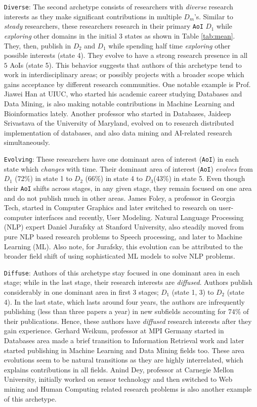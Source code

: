 \texttt{Diverse}: The second archetype consists of researchers with \emph{diverse} research interests as they make significant contributions in multiple $D_m$'s. Similar to \emph{steady} researchers, these researchers research in their primary \texttt{AoI} $D_1$ while \emph{exploring} other domains in the initial $3$ states as shown in Table \ref{tab:mean}. They, then, publish in $D_2$ and $D_1$ while spending half time \emph{exploring} other possible interests (state 4). They evolve to have a strong research presence in all $5$ AoIs (state 5). This behavior suggests that authors of this archetype tend to work in interdisciplinary areas; or possibly projects with a broader scope which gains acceptance by different research communities.
One notable example is Prof. Jiawei Han at UIUC, who started his academic career studying Databases and Data Mining, is also making notable contributions in Machine Learning and Bioinformatics lately.
Another professor who started in Databases, Jaideep Srivastava of the University of Maryland, evolved on to research distributed implementation of databases, and also data mining and AI-related research simultaneously.

\texttt{Evolving}: These researchers have one dominant area of interest (\texttt{AoI}) in each state which \emph{changes} with time. Their dominant  area of interest (\texttt{AoI}) \emph{evolves} from $D_1$ (72\%) in state 1 to $D_2$ (66\%) in state 4 to $D_3$(43\%) in state 5. Even though their \texttt{AoI} shifts across stages, in any given stage, they remain focused on one area and do not publish much in other areas.
James Foley, a professor in Georgia Tech, started in Computer Graphics and later switched to research on user-computer interfaces and recently, User Modeling.
Natural Language Processing (NLP) expert Daniel Jurafsky at Stanford University, also steadily moved from pure NLP based research problems to Speech processing, and later to Machine Learning (ML). Also note, for Jurafsky, this evolution can be attributed to the broader field shift of using sophisticated ML models to solve NLP problems.

\texttt{Diffuse}: Authors of this archetype stay focused in one dominant area in each stage; while in the last stage, their research interests are \emph{diffused}. Authors publish considerably in one dominant area in first 3 stages; $D_1$ (state 1, 3) to $D_2$ (state 4). In the last state, which lasts around four years, the authors are infrequently publishing (less than three papers a year) in new subfields accounting for 74\% of their publications. Hence, these authors have \emph{diffused} research interests after they gain experience.
Gerhard Weikum, professor at MPI Germany started in Databases area made a brief transition to Information Retrieval work and later started publishing in Machine Learning and Data Mining fields too. These area evolutions seem to be natural transitions as they are highly interrelated, which explains contributions in all fields.
Anind Dey, professor at Carnegie Mellon University, initially worked on sensor technology and then switched to Web mining and Human Computing related research problems is also another example of this archetype.

